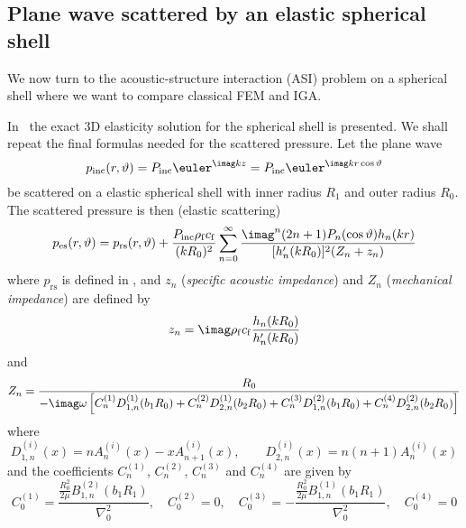 \clearpage
\subsection{Plane wave scattered by an elastic spherical shell}
We now turn to the acoustic-structure interaction (ASI) problem on a spherical shell where we want to compare classical FEM and IGA.

In~\cite[pp. 12-20]{Chang1994voa} the exact 3D elasticity solution for the spherical shell is presented. We shall repeat the final formulas needed for the scattered pressure.
Let the plane wave
\begin{equation*}
	p_{\textrm{inc}}(r,\vartheta) = P_{\mathrm{inc}}\euler^{\imag kz} = P_{\mathrm{inc}}\euler^{\imag kr\cos\vartheta}
\end{equation*}
be scattered on a elastic spherical shell with inner radius $R_1$ and outer radius $R_0$. The scattered pressure is then (elastic scattering)
\begin{equation}\label{Eq2:exact3DscatteringSphericalShellSol}
	p_{\mathrm{es}}(r,\vartheta) = p_{\mathrm{rs}}(r,\vartheta) + \frac{P_{\mathrm{inc}}\rho_{\mathrm{f}} c_{\mathrm{f}}}{(kR_0)^2}\sum_{n=0}^\infty \frac{\imag^n(2n+1)P_n(\cos\vartheta)h_n(kr)}{[h_n'(kR_0)]^2(Z_n+z_n)}
\end{equation}
where $p_{\mathrm{rs}}$ is defined in , and $z_n$ (\textit{specific acoustic impedance}) and $Z_n$ (\textit{mechanical impedance}) are defined by
\begin{equation*}
	z_n = \imag\rho_{\mathrm{f}} c_{\mathrm{f}}\frac{h_n(kR_0)}{h_n'(kR_0)}
\end{equation*}
and
\begin{equation*}
	Z_n =\frac{R_0}{-\imag\omega\left[C_n^{(1)} D_{1,n}^{(1)}(b_1 R_0) + C_n^{(2)} D_{2,n}^{(1)}(b_2 R_0) + C_n^{(3)} D_{1,n}^{(2)}(b_1 R_0) + C_n^{(4)} D_{2,n}^{(2)}(b_2 R_0)\right]}
\end{equation*}
where 
\begin{equation*}
	D_{1,n}^{(i)}(x) = nA_n^{(i)}(x)-xA_{n+1}^{(i)}(x),\qquad	D_{2,n}^{(i)}(x) = n(n+1)A_n^{(i)}(x)	
\end{equation*}
and the coefficients $C_n^{(1)}$, $C_n^{(2)}$, $C_n^{(3)}$ and $C_n^{(4)}$ are given by
\begin{equation*}
	C_0^{(1)} = \frac{\frac{R_0^2}{2\mu}B_{1,n}^{(2)}(b_1 R_1)}{\nabla^2_0},\quad C_0^{(2)}=0,\quad
	C_0^{(3)} = -\frac{\frac{R_0^2}{2\mu}B_{1,n}^{(1)}(b_1 R_1)}{\nabla^2_0},\quad C_0^{(4)}=0
\end{equation*}

